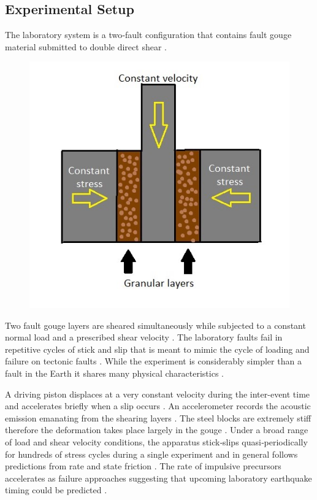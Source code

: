\documentclass[]{llncs} %
\begin{document}
\subsection{Experimental Setup}
The laboratory system is a two‐fault configuration that contains fault gouge material submitted to double direct shear \cite{kaggle}. \par
\begin{figure}[h]
	\centering
	\includegraphics[width=.6\linewidth]{lab}
	\caption{}
	\label{fig:lab}
\end{figure}
Two fault gouge layers are sheared simultaneously while subjected to a constant normal load and a prescribed shear velocity \cite{kaggle}. The laboratory faults fail in repetitive cycles of stick and slip that is meant to mimic the cycle of loading and failure on tectonic faults \cite{kaggle}. While the experiment is considerably simpler than a fault in the Earth it shares many physical characteristics \cite{kaggle}. \par

A driving piston displaces at a very constant velocity during the inter-event time and accelerates briefly when a slip occurs \cite{Bertrand}. An accelerometer records the acoustic emission emanating from the shearing layers \cite{Bertrand}. The steel blocks are extremely stiff therefore the deformation takes place largely in the gouge \cite{Bertrand}. Under a broad range of load and shear velocity conditions, the apparatus stick‐slips quasi‐periodically for hundreds of stress cycles during a single experiment and in general follows predictions from rate and state friction \cite{Bertrand}. The rate of impulsive precursors accelerates as failure approaches suggesting that upcoming laboratory earthquake timing could be predicted \cite{Bertrand}. \par
\end{document}
